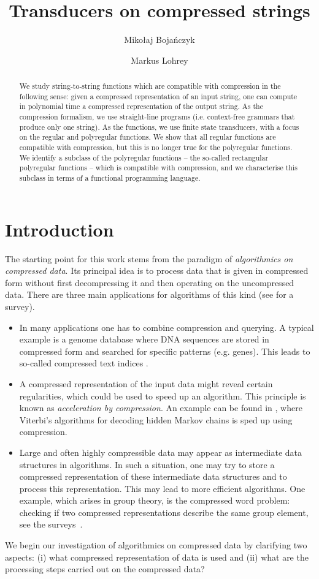 \documentclass[a4paper,UKenglish,cleveref, autoref, thm-restate]{lipics-v2021}
\title{Transducers on compressed strings}
\author{Mikołaj Bojańczyk}{University of Warsaw, Poland \and \url{https://www.mimuw.edu.pl/~bojan/}}{bojan@mimuw.edu.pl}{https://orcid.org/0000-0002-7758-1072}{Mikołaj Bojańczyk was supported by the Polish National Science Centre (NCN) grant ``Polynomial finite state computation'' (2022/46/A/ST6/00072).}
\author{Markus Lohrey}{University of Siegen, Germany \and \url{https://www.uni-siegen.de/person/markus-lohrey}}{lohrey@eti.uni-siegen.de}{https://orcid.org/0000-0002-4680-7198}{}
\begin{document}
\maketitle

\begin{abstract}
We study string-to-string functions which are compatible with compression in the following sense: given a compressed representation of an input string, one can compute in polynomial time a compressed representation of the output string. As the compression formalism, we use straight-line programs (i.e. context-free grammars that produce only one string). As the functions, we use finite state transducers, with a focus on the regular and polyregular functions. We show that all regular functions are compatible with compression, but this is no longer true for the polyregular functions. We identify a subclass of the polyregular functions -- the so-called rectangular polyregular functions -- which is compatible with compression, and we characterise this subclass in terms of a functional programming language.
\end{abstract}


\section{Introduction}

The starting point for this work stems from the paradigm of {\em algorithmics on compressed data}. 
Its principal idea is to process data that is given in compressed form without first decompressing it and then operating on the uncompressed data.
There are three main applications for algorithms of this kind (see  \cite{Loh12survey} for a survey).
\begin{itemize}
\item  In many applications one has to combine compression and querying. A typical example 
is a genome database where DNA sequences are stored in compressed form and searched for specific patterns (e.g. genes).
This leads to so-called compressed text indices \cite{CNP21,FeMa05}.
\item A compressed representation of the input data might reveal
certain regularities, which could be used to speed up an algorithm. This principle is 
known as {\em acceleration by compression}. An example can be found in \cite{LMWZiv07},
where Viterbi's algorithms for decoding  
hidden Markov chains is sped up using compression.
\item Large and often highly compressible data may appear as 
intermediate data structures in algorithms. In such a situation, one may try to 
store a compressed representation of these intermediate data structures
and to process this representation. This may lead to more efficient 
algorithms. One example, which arises in group theory, is the compressed word problem:  checking if two compressed representations describe the same group element, see the surveys~\cite{BKLMNRS20,Loh14}.
\end{itemize}
We begin our investigation of algorithmics on compressed data by clarifying two aspects: (i)
what compressed representation of data is used and (ii)
what are the processing steps carried out on the compressed data? 
\end{document}
